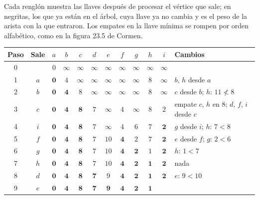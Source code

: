 \documentclass[11pt,letterpaper]{article}
\begin{document}
\begin{ejemplo}
  \label{ej:prim-cormen}
  Cada renglón muestra las llaves después de procesar el vértice que
  sale; en negritas, los que ya están en el árbol, cuya llave ya no
  cambia y es el peso de la arista con la que entraron. Los empates en
  la llave mínima se rompen por orden alfabético, como en la figura
  23.5 de Cormen.
  \begin{center}
  \small
  \setlength{\tabcolsep}{4pt}
  \begin{tabular}{cc*{9}{c}>{\raggedright\arraybackslash}p{5.2cm}}
    \toprule
    \textbf{Paso} & \textbf{Sale} & $a$ & $b$ & $c$ & $d$ & $e$ & $f$
      & $g$ & $h$ & $i$ & \textbf{Cambios} \\
    \midrule
    0 & & $0$ & $\infty$ & $\infty$ & $\infty$ & $\infty$ & $\infty$
      & $\infty$ & $\infty$ & $\infty$ & \\
    1 & $a$ & $\mathbf{0}$ & $4$ & $\infty$ & $\infty$ & $\infty$
      & $\infty$ & $\infty$ & $8$ & $\infty$ & $b$, $h$ desde $a$ \\
    2 & $b$ & $\mathbf{0}$ & $\mathbf{4}$ & $8$ & $\infty$ & $\infty$
      & $\infty$ & $\infty$ & $8$ & $\infty$
      & $c$ desde $b$; $h$: $11 \not< 8$ \\
    3 & $c$ & $\mathbf{0}$ & $\mathbf{4}$ & $\mathbf{8}$ & $7$
      & $\infty$ & $4$ & $\infty$ & $8$ & $2$
      & empate $c$, $h$ en $8$; $d$, $f$, $i$ desde $c$ \\
    4 & $i$ & $\mathbf{0}$ & $\mathbf{4}$ & $\mathbf{8}$ & $7$
      & $\infty$ & $4$ & $6$ & $7$ & $\mathbf{2}$
      & $g$ desde $i$; $h$: $7 < 8$ \\
    5 & $f$ & $\mathbf{0}$ & $\mathbf{4}$ & $\mathbf{8}$ & $7$ & $10$
      & $\mathbf{4}$ & $2$ & $7$ & $\mathbf{2}$
      & $e$ desde $f$; $g$: $2 < 6$ \\
    6 & $g$ & $\mathbf{0}$ & $\mathbf{4}$ & $\mathbf{8}$ & $7$ & $10$
      & $\mathbf{4}$ & $\mathbf{2}$ & $1$ & $\mathbf{2}$
      & $h$: $1 < 7$ \\
    7 & $h$ & $\mathbf{0}$ & $\mathbf{4}$ & $\mathbf{8}$ & $7$ & $10$
      & $\mathbf{4}$ & $\mathbf{2}$ & $\mathbf{1}$ & $\mathbf{2}$
      & nada \\
    8 & $d$ & $\mathbf{0}$ & $\mathbf{4}$ & $\mathbf{8}$ & $\mathbf{7}$
      & $9$ & $\mathbf{4}$ & $\mathbf{2}$ & $\mathbf{1}$ & $\mathbf{2}$
      & $e$: $9 < 10$ \\
    9 & $e$ & $\mathbf{0}$ & $\mathbf{4}$ & $\mathbf{8}$ & $\mathbf{7}$
      & $\mathbf{9}$ & $\mathbf{4}$ & $\mathbf{2}$ & $\mathbf{1}$

\end{tabular}
\end{center}
\end{ejemplo}
\end{document}
